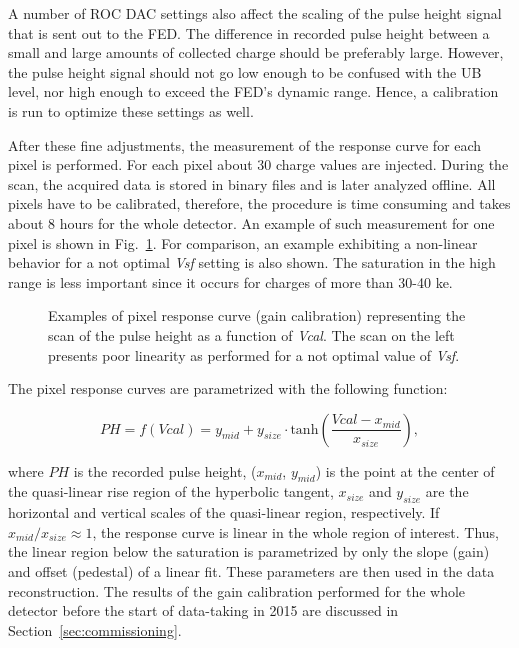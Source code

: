 A number of ROC DAC settings also affect the scaling of the pulse height signal that is sent out to the FED. The difference in recorded pulse height between a small and large amounts of collected charge should be preferably large.
However, the pulse height signal should not go low enough to be confused with the UB level, nor high enough to exceed the FED's dynamic range.
Hence, a calibration is run to optimize these settings as well.

After these fine adjustments, the measurement of the response curve for each pixel is performed. For each pixel about 30 charge values are injected. 
During the scan, the acquired data is stored in binary files and is later analyzed offline. All pixels have to be calibrated, therefore, the procedure is time consuming and takes about 8 hours for the whole detector.
An example of such measurement for one pixel is shown in Fig.~\ref{fig:GainCalib}. For comparison, an example exhibiting a non-linear behavior for a not optimal \textit{Vsf} setting is also shown.
The saturation in the high range is less important since it occurs for charges of more than 30-40 ke.

\begin{figure}[!htb]
 \begin{center}
 \end{center}
 \caption{Examples of pixel response curve (gain calibration) representing the scan of the pulse height as a function of \textit{Vcal}. The scan on the left presents poor linearity as performed for a not optimal value of \textit{Vsf}.}
 \label{fig:GainCalib}
\end{figure}

The pixel response curves are parametrized with the following function:

\begin{equation}
PH = f(Vcal) = y_{mid} + y_{size} \cdot \mathrm{tanh}\left( \frac{Vcal - x_{mid}}{x_{size}} \right),
\end{equation}

where $PH$ is the recorded pulse height,
($x_{mid}$, $y_{mid}$) is the point at the center of the quasi-linear rise region of the hyperbolic tangent,
$x_{size}$ and $y_{size}$ are the horizontal and vertical scales of the quasi-linear region, respectively.
If $x_{mid}/x_{size} \approx 1$, the response curve is linear in the whole region of interest.
Thus, the linear region below the saturation is
parametrized by only the slope (gain) and offset (pedestal) of a linear fit.
These parameters are then used in the data reconstruction. 
The results of the gain calibration performed for the whole detector before the start of data-taking in 2015 are discussed in Section~\ref{sec:commissioning}.

